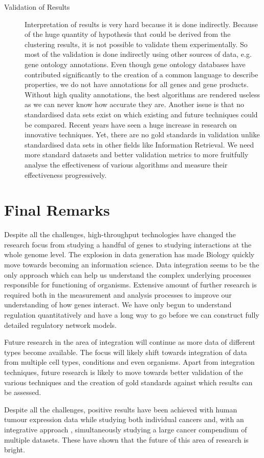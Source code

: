 \begin{description}
\item[Validation of Results] Interpretation of results is very hard because it is done indirectly. Because of the huge quantity of hypothesis that could be derived from the clustering results, it is not possible to validate them experimentally. So most of the validation is done indirectly using other sources of data, e.g. gene ontology annotations. Even though gene ontology databases have contributed significantly to the creation of a common language to describe properties, we do not have annotations for all genes and gene products. Without high quality annotations, the best algorithms are rendered useless as we can never know how accurate they are. Another issue is that no standardised data sets exist on which existing and future techniques could be compared. Recent years have seen a huge increase in research on innovative techniques. Yet, there are no gold standards in validation unlike standardised data sets in other fields like Information Retrieval. We need more standard datasets and better validation metrics to more fruitfully analyse the effectiveness of various algorithms and measure their effectiveness progressively.
 
\end{description}

\section{Final Remarks} 

Despite all the challenges, high-throughput technologies have changed the research focus from studying a handful of genes to studying interactions at the whole genome level. The explosion in data generation has made Biology quickly move towards becoming an information science. Data integration seems to be the only approach which can help us understand the complex underlying processes responsible for functioning of organisms. Extensive amount of further research is required both in the measurement and analysis processes to improve our understanding of how genes interact. We have only begun to understand regulation quantitatively and have a long way to go before we can construct fully detailed regulatory network models. 

Future research in the area of integration will continue as more data of different types become available. The focus will likely shift towards integration of data from multiple cell types, conditions and even organisms. Apart from integration techniques, future research is likely to move towards better validation of the various techniques and the creation of gold standards against which results can be assessed. 

Despite all the challenges, positive results have been achieved with human tumour expression data while studying both individual cancers and, with an integrative approach \citep{segal04module}, simultaneously studying a large cancer compendium of multiple datasets. These have shown that the future of this area of research is bright.